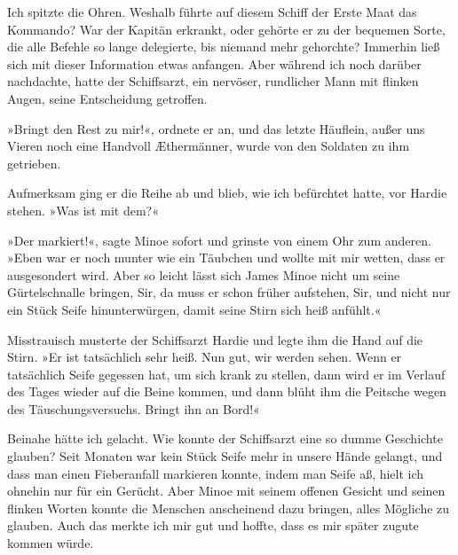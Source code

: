 Ich spitzte die Ohren. Weshalb führte auf diesem Schiff der Erste
Maat das Kommando? War der Kapitän erkrankt, oder gehörte er zu der
bequemen Sorte, die alle Befehle so lange delegierte, bis niemand
mehr gehorchte? Immerhin ließ sich mit dieser Information etwas
anfangen. Aber während ich noch darüber nachdachte, hatte der
Schiffsarzt, ein nervöser, rundlicher Mann mit flinken Augen, seine
Entscheidung getroffen.

»Bringt den Rest zu mir!«, ordnete er an, und das letzte Häuflein,
außer uns Vieren noch eine Handvoll Æthermänner, wurde von den
Soldaten zu ihm getrieben.

Aufmerksam ging er die Reihe ab und blieb, wie ich befürchtet
hatte, vor Hardie stehen. »Was ist mit dem?«

»Der markiert!«, sagte Minoe sofort und grinste von einem Ohr zum
anderen. »Eben war er noch munter wie ein Täubchen und wollte mit
mir wetten, dass er ausgesondert wird. Aber so leicht lässt sich
James Minoe nicht um seine Gürtelschnalle bringen, Sir, da muss er
schon früher aufstehen, Sir, und nicht nur ein Stück Seife
hinunterwürgen, damit seine Stirn sich heiß anfühlt.«

Misstrauisch musterte der Schiffsarzt Hardie und legte ihm die Hand
auf die Stirn. »Er ist tatsächlich sehr heiß. Nun gut, wir werden
sehen. Wenn er tatsächlich Seife gegessen hat, um sich krank zu
stellen, dann wird er im Verlauf des Tages wieder auf die Beine
kommen, und dann blüht ihm die Peitsche wegen des
Täuschungsversuchs. Bringt ihn an Bord!«

Beinahe hätte ich gelacht. Wie konnte der Schiffsarzt eine so dumme
Geschichte glauben? Seit Monaten war kein Stück Seife mehr in
unsere Hände gelangt, und dass man einen Fieberanfall markieren
konnte, indem man Seife aß, hielt ich ohnehin nur für ein Gerücht.
Aber Minoe mit seinem offenen Gesicht und seinen flinken Worten
konnte die Menschen anscheinend dazu bringen, alles Mögliche zu
glauben. Auch das merkte ich mir gut und hoffte, dass es mir später
zugute kommen würde.

